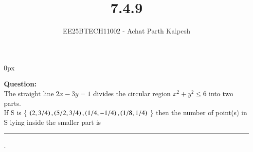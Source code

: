 \documentclass[journal]{IEEEtran}
\begin{document}

\title{7.4.9}
\author{EE25BTECH11002 - Achat Parth Kalpesh }
{\let\newpage\relax\maketitle}
\renewcommand{\thefigure}{\theenumi}
\renewcommand{\thetable}{\theenumi}
\setlength{\intextsep}{10pt} %
\renewcommand{\thetable}{\theenumi}
\parindent 0px



\textbf{Question:}\\
 The straight line $2x-3y=1$ divides the circular region $x^2+y^2\leq6$ into two parts.\\
If  S  is \{ $\left(2, 3/4\right), \left(5/2, 3/4\right), \left(1/4, -1/4\right), \left(1/8, 1/4\right)$ \}  then the  number of point(s) in S lying inside the smaller part is  \rule{1cm}{0.01pt}.
\end{document}
